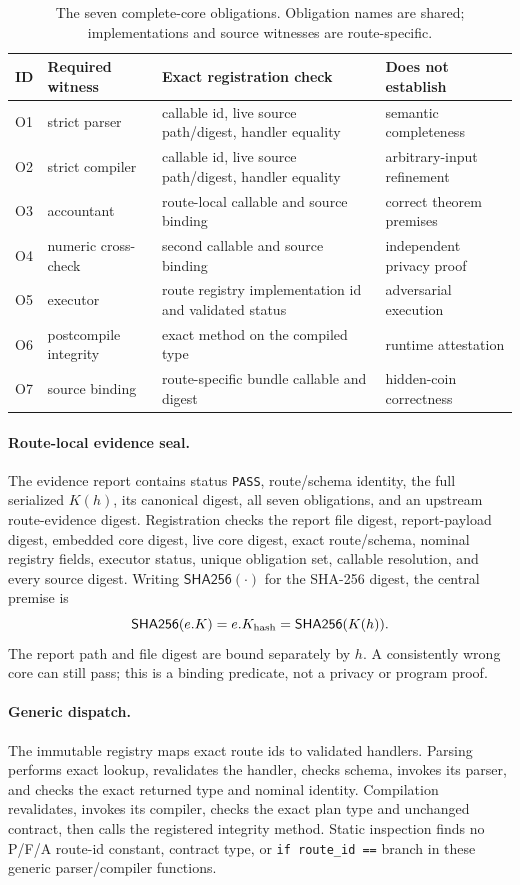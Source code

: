 \documentclass[letterpaper]{article}
\begin{document}
\begin{table}[t]
\centering
\scriptsize
\setlength{\tabcolsep}{4pt}
\begin{tabular}{@{}llp{}p{}@{}}
\toprule
ID & Required witness & Exact registration check & Does not establish \\
\midrule
O1 & strict parser & callable id, live source path/digest, handler equality &
semantic completeness \\
O2 & strict compiler & callable id, live source path/digest, handler equality &
arbitrary-input refinement \\
O3 & accountant & route-local callable and source binding &
correct theorem premises \\
O4 & numeric cross-check & second callable and source binding &
independent privacy proof \\
O5 & executor & route registry implementation id and validated status &
adversarial execution \\
O6 & postcompile integrity & exact method on the compiled type &
runtime attestation \\
O7 & source binding & route-specific bundle callable and digest &
hidden-coin correctness \\
\bottomrule
\end{tabular}
\caption{The seven complete-core obligations.  Obligation names are shared;
implementations and source witnesses are route-specific.}
\label{tab:supp-core-obligations}
\end{table}

\paragraph{Route-local evidence seal.}
The evidence report contains status \texttt{PASS}, route/schema identity, the
full serialized $K(h)$, its canonical digest, all seven obligations, and an
upstream route-evidence digest.  Registration checks the report file digest,
report-payload digest, embedded core digest, live core digest, exact
route/schema, nominal registry fields, executor status, unique obligation set,
callable resolution, and every source digest.  Writing
$\mathsf{SHA256}(\cdot)$ for the SHA-256 digest, the central premise is
\[
 \mathsf{SHA256}(e.K)=e.K_{\rm hash}=\mathsf{SHA256}(K(h)).
\]
The report path and file digest are bound separately by $h$.  A consistently
wrong core can still pass; this is a binding predicate, not a privacy or
program proof.

\paragraph{Generic dispatch.}
The immutable registry maps exact route ids to validated handlers.  Parsing
performs exact lookup, revalidates the handler, checks schema, invokes its
parser, and checks the exact returned type and nominal identity.  Compilation
revalidates, invokes its compiler, checks the exact plan type and unchanged
contract, then calls the registered integrity method.  Static inspection finds
no P/F/A route-id constant, contract type, or \texttt{if route\_id ==} branch
in these generic parser/compiler functions.
\end{document}
